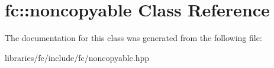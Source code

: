 \hypertarget{classfc_1_1noncopyable}{}\section{fc\+:\+:noncopyable Class Reference}
\label{classfc_1_1noncopyable}


The documentation for this class was generated from the following file\+:\begin{DoxyCompactItemize}
\item 
libraries/fc/include/fc/noncopyable.\+hpp\end{DoxyCompactItemize}
